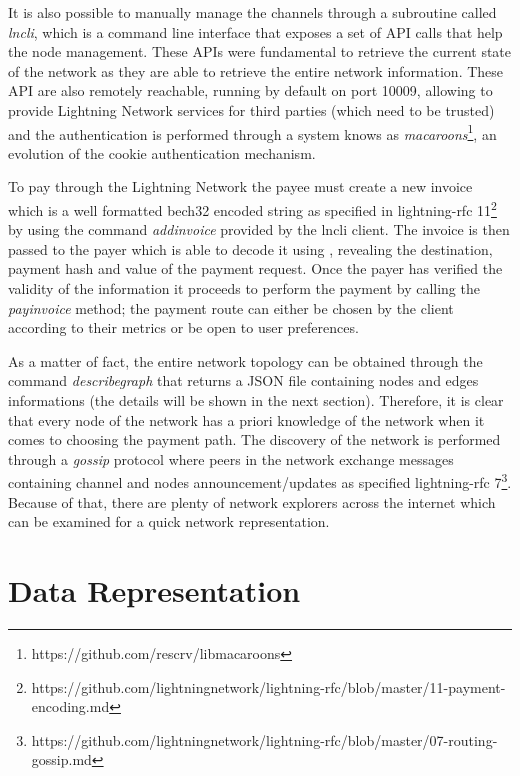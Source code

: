 	It is also possible to manually manage the channels through a subroutine called \textit{lncli}, which is a command line interface that exposes a set of API calls that help the node management. These APIs were fundamental to retrieve the current state of the network as they are able to retrieve the entire network information. These API are also remotely reachable, running by default on port 10009, allowing to provide Lightning Network services for third parties (which need to be trusted) and the authentication is performed through a system knows as \textit{macaroons}\footnote{https://github.com/rescrv/libmacaroons}, an evolution of the cookie authentication mechanism. 
	
	To pay through the Lightning Network the payee must create a new invoice which is a well formatted bech32 encoded string as specified in lightning-rfc 11\footnote{https://github.com/lightningnetwork/lightning-rfc/blob/master/11-payment-encoding.md} by using the command \textit{addinvoice} provided by the lncli client. The invoice is then passed to the payer which is able to decode it using , revealing the destination, payment hash and value of the payment request. Once the payer has verified the validity of the information it proceeds to perform the payment by calling the \textit{payinvoice} method; the payment route can either be chosen by the client according to their metrics or be open to user preferences.	
	
	As a matter of fact, the entire network topology can be obtained through the command \textit{describegraph} that returns a JSON file containing nodes and edges informations (the details will be shown in the next section). Therefore, it is clear that every node of the network has a priori knowledge of the network when it comes to choosing the payment path. The discovery of the network is performed through a \textit{gossip} protocol where peers in the network exchange messages containing channel and nodes announcement/updates as specified lightning-rfc 7\footnote{https://github.com/lightningnetwork/lightning-rfc/blob/master/07-routing-gossip.md}. Because of that, there are plenty of network explorers across the internet which can be examined for a quick network representation.
	
	\section{Data Representation}
	
